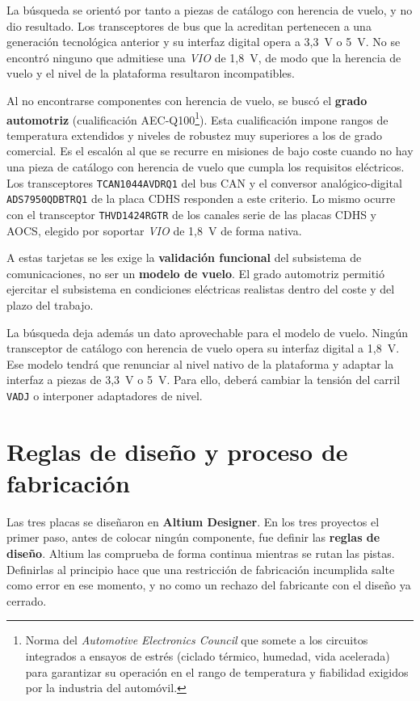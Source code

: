 La búsqueda se orientó por tanto a piezas de catálogo con herencia de vuelo, y no dio resultado.
Los transceptores de bus que la acreditan pertenecen a una generación tecnológica anterior y su
interfaz digital opera a 3,3~V o 5~V. No se encontró ninguno que admitiese una \textit{VIO} de 1,8~V,
de modo que la herencia de vuelo y el nivel de la plataforma resultaron incompatibles.

Al no encontrarse componentes con herencia de vuelo, se buscó el \textbf{grado automotriz} (cualificación
AEC-Q100\footnote{Norma del \textit{Automotive Electronics Council} que somete a los circuitos
integrados a ensayos de estrés (ciclado térmico, humedad, vida acelerada) para garantizar su
operación en el rango de temperatura y fiabilidad exigidos por la industria del automóvil.}).
Esta cualificación impone rangos de temperatura extendidos y niveles de robustez muy superiores a
los de grado comercial. Es el escalón al que se recurre en misiones de bajo coste cuando no hay
una pieza de catálogo con herencia de vuelo que cumpla los requisitos eléctricos. Los transceptores
\texttt{TCAN1044AVDRQ1} del bus CAN y el conversor analógico-digital \texttt{ADS7950QDBTRQ1} de la
placa CDHS responden a este criterio. Lo mismo ocurre con el transceptor \texttt{THVD1424RGTR} de
los canales serie de las placas CDHS y AOCS, elegido por soportar \textit{VIO} de 1,8~V de forma
nativa.

A estas tarjetas se les exige la \textbf{validación funcional} del subsistema de comunicaciones,
no ser un \textbf{modelo de vuelo}. El grado automotriz permitió ejercitar el subsistema en
condiciones eléctricas realistas dentro del coste y del plazo del trabajo.

La búsqueda deja además un dato aprovechable para el modelo de vuelo. Ningún transceptor de
catálogo con herencia de vuelo opera su interfaz digital a 1,8~V. Ese modelo tendrá que renunciar
al nivel nativo de la plataforma y adaptar la interfaz a piezas de 3,3~V o 5~V. Para ello, deberá
cambiar la tensión del carril \texttt{VADJ} o interponer adaptadores de nivel.

\section{Reglas de diseño y proceso de fabricación}

Las tres placas se diseñaron en \textbf{Altium Designer}. En los tres proyectos el primer paso,
antes de colocar ningún componente, fue definir las \textbf{reglas de diseño}. Altium las
comprueba de forma continua mientras se rutan las pistas. Definirlas al principio hace que una
restricción de fabricación incumplida salte como error en ese momento, y no como un rechazo del
fabricante con el diseño ya cerrado.

